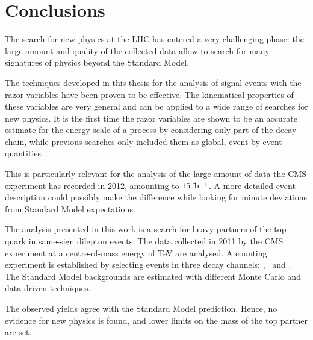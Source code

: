 \chapter*{Conclusions}
The search for new physics at the LHC has entered a very challenging phase:
the large amount and quality of the collected data allow to search for many
signatures of physics beyond the Standard Model.

The techniques developed in this thesis for the analysis of signal events with the razor variables have been proven to be
effective. The kinematical properties of these variables are very general and can be
applied to a wide range of searches for new physics. It is the first
time the razor variables are shown to be an accurate estimate for the energy
scale of a process by considering only part of the decay chain, while
previous searches only included them as global, event-by-event quantities.

This is particularly
relevant for the analysis of the large amount of data the CMS experiment has
recorded in 2012, amounting to $\unit[15]{fb^{-1}}$. A more detailed event
description could possibly make the difference while looking for minute
deviations from Standard Model expectations.

The analysis presented in this work is a search for heavy partners of the
top quark in same-sign dilepton events. The data collected in 2011 by the
CMS experiment at a centre-of-mass energy of \unit[7]{TeV} are analysed. A
counting experiment is established by selecting events in three decay
channels: \E\E, \E\M\ and \M\M. The Standard Model backgrounds are estimated
with different Monte Carlo and data-driven techniques.

The observed yields agree with the Standard Model prediction. Hence, no
evidence for new physics is found, and lower limits on the mass of the top
partner are set.
